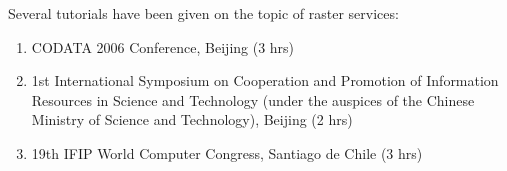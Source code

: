 Several tutorials have been given on the topic of raster services:
\begin{enumerate}
\item CODATA 2006 Conference, Beijing (3 hrs)
\item 1st International Symposium on Cooperation and Promotion of Information Resources in
  Science and Technology (under the auspices of the Chinese Ministry of Science and
  Technology), Beijing (2 hrs)
\item 19th IFIP World Computer Congress, Santiago de Chile (3 hrs)
\end{enumerate}


\nocite{PB:comogis,PB:codata,PB:fig}
